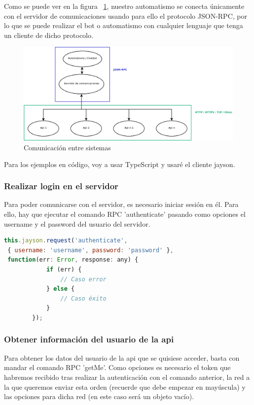 \documentclass[spanish,12pt, a4paper, twoside]{paper}
\begin{document}
Como se puede ver en la figura ~\ref{fig:Comunicación entre sistemas}, nuestro automatismo se conecta únicamente con el servidor de comunicaciones usando para ello el protocolo JSON-RPC, por lo que se puede realizar el bot o automatismo con cualquier lenguaje que tenga un cliente de dicho protocolo.

\begin{figure}
\centering
	\includegraphics[width=\textwidth]{recursos/Comunication}
\caption{Comunicación entre sistemas}
\label{fig:Comunicación entre sistemas}
\end{figure}

Para los ejemplos en código, voy a usar TypeScript y usaré el cliente jayson.

\subsubsection{Realizar login en el servidor}

Para poder comunicarse con el servidor, es necesario iniciar sesión en él. Para ello, hay que ejecutar el comando RPC 'authenticate' pasando como opciones el username y el password del usuario del servidor.

\begin{lstlisting}[language=JavaScript]
this.jayson.request('authenticate',
 { username: 'username', password: 'password' },
 function(err: Error, response: any) {
			if (err) { 
				// Caso error
			} else {
				// Caso éxito
			}
		});
\end{lstlisting}

\subsubsection{Obtener información del usuario de la api}

Para obtener los datos del usuario de la api que se quisiese acceder, basta con mandar el comando RPC 'getMe'. Como opciones es necesario el token que habremos recibido tras realizar la autenticación con el comando anterior, la red a la que queremos enviar esta orden (recuerde que debe empezar en mayúscula) y las opciones para dicha red (en este caso será un objeto vacío).
\end{document}
